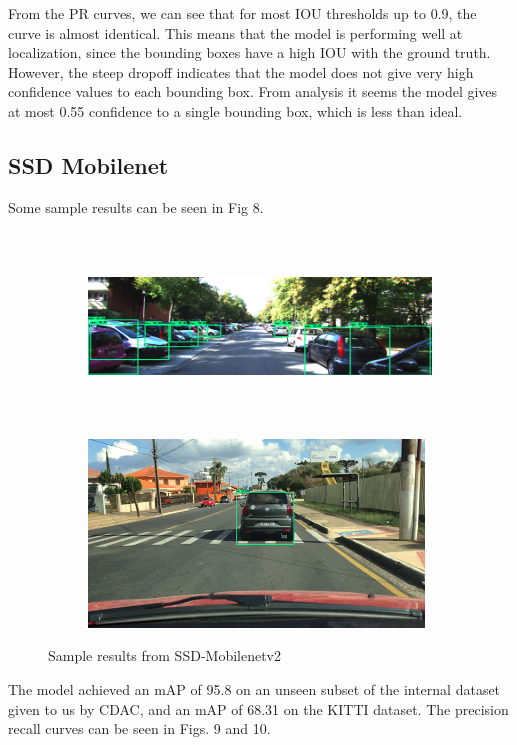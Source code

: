 \documentclass[12pt,letterpaper]{article}
\begin{document}
From the PR curves, we can see that for most IOU thresholds up to 0.9, the curve is almost identical. This means that the model is performing well at localization, since the bounding boxes have a high IOU with the ground truth. However, the steep dropoff indicates that the model does not give very high confidence values to each bounding box. From analysis it seems the model gives at most 0.55 confidence to a single bounding box, which is less than ideal. 


\subsection{SSD Mobilenet}

Some sample results can be seen in Fig 8.

\begin{figure}[h]
    \centering
    \begin{subfigure}{0.45\textwidth}
        \includegraphics[width = 0.9\linewidth,height=5cm]{assets/SSD_fig1.png}
        \caption{}
    \end{subfigure}
    \begin{subfigure}{0.45\textwidth}
        \includegraphics[width=0.9\linewidth,height=5cm]{assets/SSD_fig2.png}
        \caption{}
    \end{subfigure}
    \caption{Sample results from SSD-Mobilenetv2}
\end{figure}

The model achieved an mAP of 95.8 on an unseen subset of the internal dataset given to us by CDAC, and an mAP of 68.31 on the KITTI dataset. The precision recall curves can be seen in Figs. 9 and 10.
\end{document}
